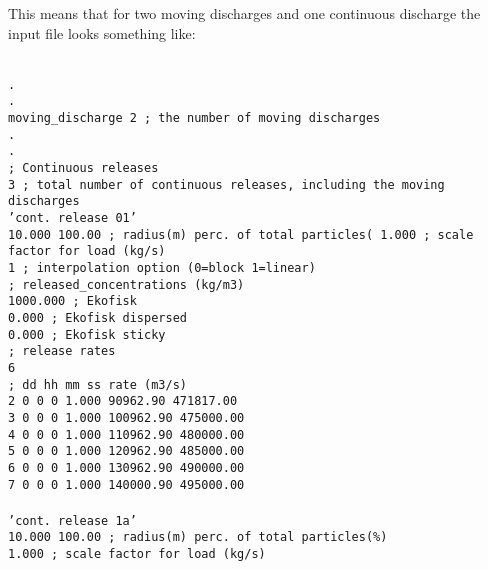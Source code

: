 \documentclass[english]{deltares_manual}
\newcommand\tab[1][1cm]{\hspace*{#1}}
\begin{document}
This means that for two moving discharges and one continuous discharge the input file looks something like:
\begin{tcolorbox}
\footnotesize
\texttt{\\
.\\
.\\
moving\_discharge 2  \tab ; the number of moving discharges\\
.\\
.\\
;                            Continuous releases \\
3 \tab ; total number of continuous releases, including the moving discharges\\
'cont. release 01'\\
10.000   \tab      100.00    \tab            ; radius(m)       perc. of total particles(%
1.000         \tab                      ; scale factor for load (kg/s)\\
1           \tab                    ; interpolation option (0=block 1=linear)\\
; released\_concentrations (kg/m3)\\
1000.000        \tab; Ekofisk\\
0.000       \tab ; Ekofisk dispersed\\
0.000       \tab ; Ekofisk sticky\\
; release rates\\
6\\
; dd hh mm ss     rate (m3/s)\\
2  0  0  0      \tab   1.000  \tab     90962.90 \tab     471817.00  \\
3  0  0  0     \tab    1.000 \tab     100962.90 \tab     475000.00  \\
4  0  0  0     \tab    1.000  \tab    110962.90 \tab     480000.00  \\
5  0  0  0     \tab    1.000  \tab    120962.90 \tab     485000.00  \\
6  0  0  0     \tab    1.000  \tab    130962.90 \tab     490000.00  \\
7  0  0  0     \tab    1.000  \tab    140000.90  \tab    495000.00  \\
 \\
'cont. release 1a' \\
10.000      \tab   100.00       \tab         ; radius(m)       perc. of total particles(\%)\\
1.000                              \tab ; scale factor for load (kg/s)\\
}
\end{tcolorbox}
\end{document}
